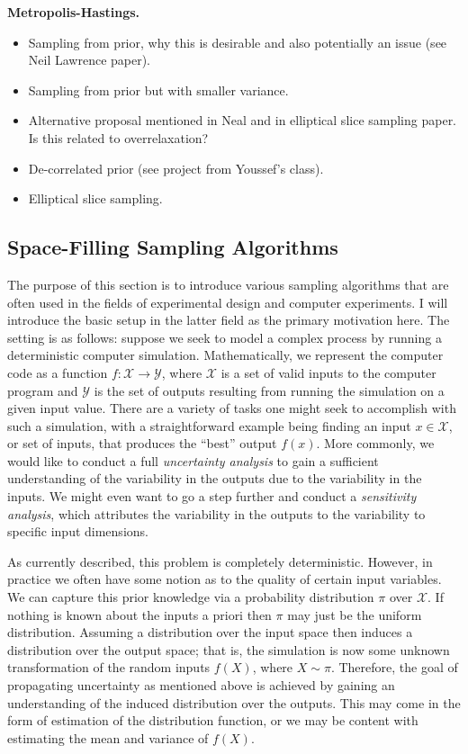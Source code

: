 \documentclass[12pt]{article}
\begin{document}
\bigskip
\noindent
\textbf{Metropolis-Hastings.}
\begin{itemize}
\item Sampling from prior, why this is desirable and also potentially an issue (see Neil Lawrence paper).
\item Sampling from prior but with smaller variance. 
\item Alternative proposal mentioned in Neal and in elliptical slice sampling paper. Is this related to overrelaxation? 
\item De-correlated prior (see project from Youssef's class). 
\item Elliptical slice sampling. 
\end{itemize}

\subsection{Space-Filling Sampling Algorithms}
The purpose of this section is to introduce various sampling algorithms that are often used in the fields of experimental design and computer experiments. I will introduce the 
basic setup in the latter field as the primary motivation here. The setting is as follows: suppose we seek to model a complex process by running a deterministic computer simulation. 
Mathematically, we represent the computer code as a function $f: \mathcal{X} \to \mathcal{Y}$, where $\mathcal{X}$ is a set of valid inputs to the computer program and 
$\mathcal{Y}$ is the set of outputs resulting from running the simulation on a given input value. There are a variety of tasks one might seek to accomplish with such a simulation, with a 
straightforward example being finding an input $x \in \mathcal{X}$, or set of inputs, that produces the ``best'' output $f(x)$. More commonly, we would like to conduct a full \textit{uncertainty analysis}
to gain a sufficient understanding of the variability in the outputs due to the variability in the inputs. We might even want to go a step further and conduct a \textit{sensitivity analysis}, which 
attributes the variability in the outputs to the variability to specific input dimensions. 

As currently described, this problem is completely deterministic. However, in practice we often have some notion as to the quality of certain input variables. We can capture this prior knowledge via a probability distribution $\pi$ over $\mathcal{X}$. If nothing is known about the inputs a priori then $\pi$ may just be the uniform distribution. Assuming a distribution over the input space then induces a distribution over the output space; that is, the simulation is now some unknown transformation of the random inputs $f(X)$, where $X \sim \pi$. Therefore, the
goal of propagating uncertainty as mentioned above is achieved by gaining an understanding of the induced distribution over the outputs. This may come in the form of estimation of the 
distribution function, or we may be content with estimating the mean and variance of $f(X)$.  
\end{document}
